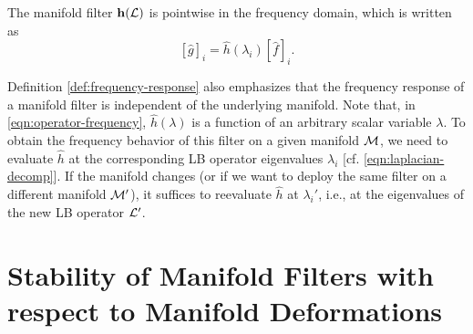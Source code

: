 \begin{proposition}
\label{prop:filter-spectral}
The manifold filter ${\mathbf h}({\mathcal L})$ is pointwise in the frequency domain, which is written as
\begin{equation}\label{eqn:convolution-general}
[\hat{g}]_i = \hat{h}(\lambda_i)[\hat{f}]_i \text{.}
\end{equation}
\end{proposition}

Definition \ref{def:frequency-response} also emphasizes that the frequency response of a manifold filter is independent of the underlying manifold. Note that, in \eqref{eqn:operator-frequency}, $\hat{h}(\lambda)$ is a function of an arbitrary scalar variable $\lambda$. To obtain the frequency behavior of this filter on a given manifold ${\mathcal M}$, we need to evaluate $\hat{h}$ at the corresponding LB operator eigenvalues $\lambda_i$ [cf. \eqref{eqn:laplacian-decomp}]. If the manifold changes (or if we want to deploy the same filter on a different manifold ${\mathcal M}'$), it suffices to reevaluate $\hat{h}$ at $\lambda_i'$, i.e., at the eigenvalues of the new LB operator ${\mathcal L}'$.



\section{Stability of Manifold Filters with respect to Manifold Deformations}\label{sec_manifold_stability}





